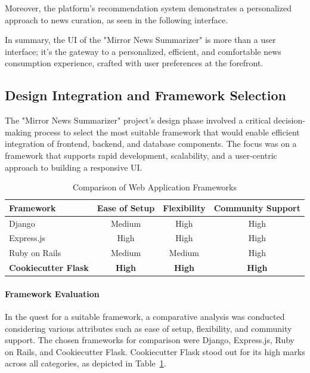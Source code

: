 \documentclass[10pt]{article}
\begin{document}
Moreover, the platform's recommendation system demonstrates a personalized approach to news curation, as seen in the following interface.

In summary, the UI of the "Mirror News Summarizer" is more than a user interface; it's the gateway to a personalized, efficient, and comfortable news consumption experience, crafted with user preferences at the forefront.

\subsection{Design Integration and Framework Selection}

The "Mirror News Summarizer" project's design phase involved a critical decision-making process to select the most suitable framework that would enable efficient integration of frontend, backend, and database components. The focus was on a framework that supports rapid development, scalability, and a user-centric approach to building a responsive UI.

\begin{table}[H]
    \centering
    \begin{tabular}{lccc}
    \hline
    \textbf{Framework} & \textbf{Ease of Setup} & \textbf{Flexibility} & \textbf{Community Support} \\ \hline
    Django\cite{django} & Medium & High & High \\
    Express.js\cite{expressjs} & High & High & High \\
    Ruby on Rails\cite{rubyonrails} & Medium & Medium & High \\
    \textbf{Cookiecutter Flask}\cite{cookiecutterflask} & \textbf{High} & \textbf{High} & \textbf{High} \\ \hline
    \end{tabular}
    \caption{Comparison of Web Application Frameworks}
    \label{tab:framework_comparison}
\end{table}

\paragraph{Framework Evaluation}
In the quest for a suitable framework, a comparative analysis was conducted considering various attributes such as ease of setup, flexibility, and community support. The chosen frameworks for comparison were Django, Express.js, Ruby on Rails, and Cookiecutter Flask. Cookiecutter Flask stood out for its high marks across all categories, as depicted in Table~\ref{tab:framework_comparison}.
\end{document}
